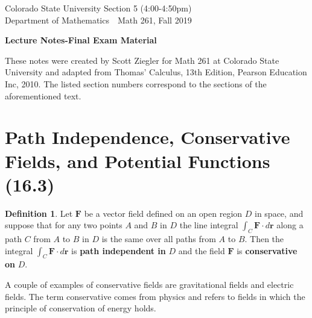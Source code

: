 \documentclass[12pt, letter]{article}
\theoremstyle{plain}
\numberwithin{theorem}{section}
\theoremstyle{definition}
\newtheorem{definition}[theorem]{Definition}
\begin{document}

\noindent
Colorado State University \hfill Section 5 (4:00-4:50pm)\\
Department of Mathematics\ \  \hfill  Math 261, Fall 2019\\
\bigskip
\thispagestyle{empty}

\begin{center}
\begin{large}
\textbf{Lecture Notes-Final Exam Material\\
}
\end{large}
\end{center}


\noindent These notes were created by Scott Ziegler for Math 261 at Colorado State University and adapted from Thomas' Calculus, 13th Edition, Pearson Education Inc, 2010. The listed section numbers correspond to the sections of the aforementioned text.


\section{Path Independence, Conservative Fields, and Potential Functions (16.3)}

\begin{definition}
Let $\bm{F}$ be a vector field defined on an open region $D$ in space, and suppose that for any two points $A$ and $B$ in $D$ the line integral $\int_C \bm{F} \cdot d\bm{r}$ along a path $C$ from $A$ to $B$ in $D$ is the same over all paths from $A$ to $B$. Then the integral $\int_C \bm{F}\cdot d\bm{r}$ is \textbf{path independent in} $D$ and the field $\bm{F}$ is \textbf{conservative on} $D$.
\end{definition}

\bigskip

A couple of examples of conservative fields are gravitational fields and electric fields. The term conservative comes from physics and refers to fields in which the principle of conservation of energy holds.
\end{document}
